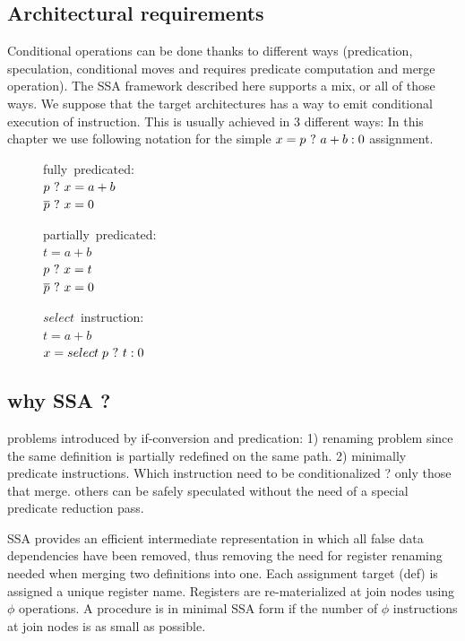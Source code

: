 \subsection{Architectural requirements}
Conditional operations can be done thanks to different ways (predication, speculation, conditional moves and requires predicate computation and merge operation). The SSA framework described here supports a mix, or all of those ways. We suppose that the target architectures has a way to emit conditional execution of instruction. This is usually achieved in 3 different ways: In this chapter we use following notation for the simple $x = p ~?~ a + b : 0$ assignment.

\begin{figure}
\begin{minipage}[t]{4cm}
\mbox{fully predicated:} \\
$ p ~?~ x = a + b $ \\
$ \overline{p} ~?~ x = 0 $ \\
\end{minipage}
\begin{minipage}[t]{4cm}
\mbox{partially predicated:} \\
$t = a + b $ \\
$p ~?~ x = t $ \\
$\overline{p} ~?~ x = 0 $ \\
\end{minipage}
\begin{minipage}[t]{4cm}
\mbox{$select$ instruction:} \\
$t = a + b $ \\
$x = select \; p ~?~ t : 0 $ \\
\end{minipage}
\end{figure}

\subsection{why SSA ?}

problems introduced by if-conversion and predication:
1) renaming problem since the same definition is partially redefined on the same path.
2) minimally predicate instructions. Which instruction need to be conditionalized ? only those that merge.  others can be safely speculated without the need of a special predicate reduction pass.

SSA \cite{BriggsSSA} provides an efficient intermediate representation in which all false data dependencies have been removed, thus removing the need for register renaming needed when merging two definitions into one. Each assignment target (def) is assigned a unique register name. Registers are re-materialized at join nodes using $\phi$ operations. A procedure is in minimal SSA form if the number of $\phi$ instructions at join nodes is as small as possible. 

